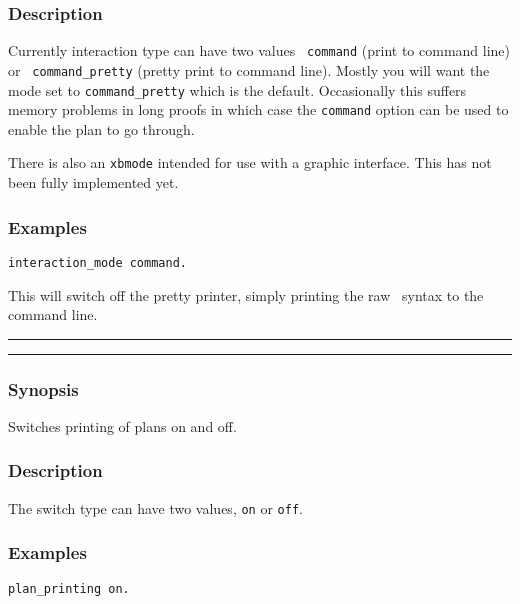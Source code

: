 \subsubsection*{Description}
Currently interaction type can have two values {\tt
  command} (print to command line) or {\tt
  command\_pretty} (pretty print to command
line).   Mostly you will want the mode set to {\tt command\_pretty}
which is the default.  Occasionally this suffers memory problems in
long proofs in which case the {\tt command} option can be used to
enable the plan to go through.

There is also an {\tt xbmode} intended for use with a
graphic interface.  This has not been fully implemented yet.

\subsubsection*{Examples}

{\tt interaction\_mode command.}

\noindent This will switch off the pretty printer, simply printing the raw
\lclam\ syntax to the command line. \\


\vspace{2mm}
\hrule
\vspace{2mm}
\begin{Large}
\end{Large}
\vspace{2mm}
\hrule
\vspace{2mm}


\subsubsection*{Synopsis}
Switches printing of plans on and off.


\subsubsection*{Description}
The switch type can have two values, {\tt on}
or {\tt off}.  

\subsubsection*{Examples}
{\tt plan\_printing on.}

